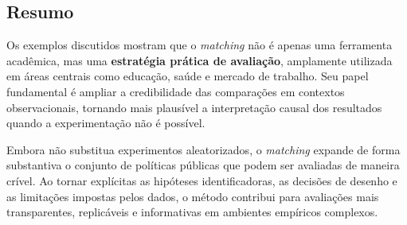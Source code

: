 \subsection*{Resumo}

Os exemplos discutidos mostram que o \textit{matching} não é apenas uma ferramenta acadêmica, mas uma \textbf{estratégia prática de avaliação}, amplamente utilizada em áreas centrais como educação, saúde e mercado de trabalho. Seu papel fundamental é ampliar a credibilidade das comparações em contextos observacionais, tornando mais plausível a interpretação causal dos resultados quando a experimentação não é possível.

Embora não substitua experimentos aleatorizados, o \textit{matching} expande de forma substantiva o conjunto de políticas públicas que podem ser avaliadas de maneira crível. Ao tornar explícitas as hipóteses identificadoras, as decisões de desenho e as limitações impostas pelos dados, o método contribui para avaliações mais transparentes, replicáveis e informativas em ambientes empíricos complexos.
